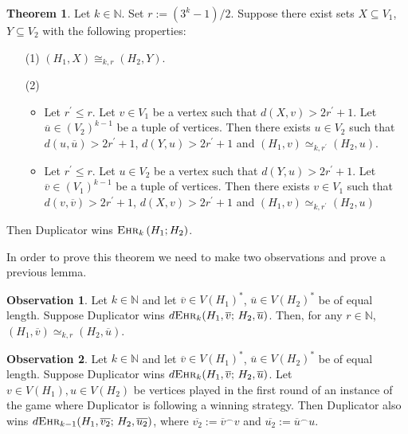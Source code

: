 \documentclass[12pt,notitlepage,a4paper]{article}
\theoremstyle{definition}
\newtheorem{theorem}{Theorem}[section]
\newtheorem{obs}{Observation}[section]
\newcommand{\N}{\mathbb{N}}
\newcommand{\ehr}{\textsc{Ehr}}
\begin{document}
\begin{theorem}\label{thm:DuplicatorAux}
	Let $k\in \N$.
	Set $r:=(3^k-1)/2$.
	Suppose there exist
	sets $X\subseteq V_1$, $Y\subseteq V_2$ with the 
	following properties:
	\begin{enumerate}
		\item[(1)] $(H_1,X)\cong_{k,r} (H_2,Y)$.
		\item[(2)]
		\begin{itemize}
			\item Let $r^\prime\leq r$. Let $v\in V_1$ be
			a vertex such that $d(X,v)> 2r^\prime + 1$. Let 
			$\overline{u}\in (V_2)^{k-1}$ be a tuple of vertices. 
			Then there exists $u\in V_2$ such that 
			$d(u,\overline{u})>2r^\prime+1$,
			$d(Y,u)>2r^\prime +1$ and
			$(H_1,v)\simeq_{k,r^\prime} (H_2,u)$.	
			\item Let $r^\prime\leq r$. Let $u\in V_2$ be
			a vertex such that $d(Y,u)> 2r^\prime + 1$. Let 
			$\overline{v}\in (V_1)^{k-1}$ be a tuple of vertices. 
			Then there exists $v\in V_1$ such that 
			$d(v,\overline{v})>2r^\prime+1$,
			$d(X,v)>2r^\prime +1$ and
			$(H_1,v)\simeq_{k,r^\prime} (H_2,u)$
		\end{itemize}
	\end{enumerate}
	Then Duplicator wins $\ehr_k\left(H_1;H_2\right)$.
\end{theorem}

In order to prove this theorem we need to make two observations
and prove a previous lemma. 

\begin{obs} \label{obs1}
	Let $k\in \N$ and let
	$\overline{v}\in V(H_1)^*$, $\overline{u}\in V(H_2)^*$ be of equal length. Suppose
	Duplicator wins $d\ehr_k(H_1,\overline{v}; \, H_2,\overline{u})$.
	Then, for any $r\in \N$, $(H_1, \overline{v})\simeq_{k,r} 
	(H_2,\overline{u})$. 
\end{obs}



\begin{obs} \label{obs2}
	Let $k\in \N$ and let
	$\overline{v}\in V(H_1)^*$, $\overline{u}\in V(H_2)^*$ be of equal length. Suppose 
	Duplicator wins $d\ehr_k(H_1,\overline{v};\,H_2,\overline{u})$. 
	Let $v\in V(H_1),u\in V(H_2)$ be vertices
	played in the first round of an instance of the game 
	where Duplicator is following a winning strategy. Then 
	Duplicator also wins $d\ehr_{k-1}(H_1,\overline{v_2}; \,
	H_2,\overline{u_2})$, where $\overline{v_2}:=\overline{v}^\smallfrown v$
	and $\overline{u_2}:=\overline{u}^\smallfrown u$.
\end{obs}
\end{document}
